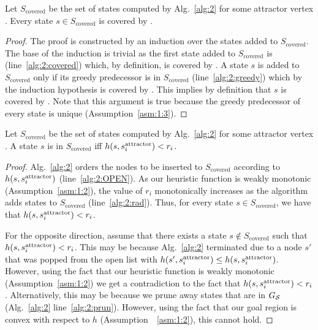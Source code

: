 \documentclass[a4paper]{report}
\begin{document}
\vspace{2mm}
\begin{lemma}
\label{lemma:covered-1}
Let $S_{\text{covered}}$ be the set of states computed by Alg.~\ref{alg:2} for some attractor vertex \sAttract.
%
Every state $s \in S_{\text{covered}}$ is covered by \sAttract.
\end{lemma}
%
\begin{proof}
The proof is constructed by an induction over the states added to $S_{\text{covered}}$.
The base of the induction is trivial as the first state added to $S_{\text{covered}}$  is \sAttract (line~\ref{alg:2:covered}) which, by definition, is covered by \sAttract.
%
A state $s$ is added to $S_{\text{covered}}$ only if its greedy predecessor is in $S_{\text{covered}}$ (line~\ref{alg:2:greedy}) which by the induction hypothesis is covered by \sAttract.
This implies by definition that $s$ is covered by \sAttract.
%
Note that this argument is true because the greedy predecessor of every state is unique (Assumption~\ref{asm:1:3}).
\end{proof}

\begin{lemma}
\label{lemma:covered-2}
Let $S_{\text{covered}}$ be the set of states computed by Alg.~\ref{alg:2} for some attractor vertex \sAttract.
%
A state $s$ is in $S_{\text{covered}}$ iff $h(s, s^{\text{attractor}}_i) < r_i$.
\end{lemma}

\begin{proof}
Alg.~\ref{alg:2} orders the nodes to be inserted to $S_{\text{covered}}$ according to $h(s, s^{\text{attractor}}_i)$ (line~\ref{alg:2:OPEN}).
As our heuristic function is weakly monotonic (Assumption~\ref{asm:1:2}), the value of $r_i$ monotonically increases as the algorithm adds states to $S_{\text{covered}}$ (line~\ref{alg:2:rad}).
Thus, for every state $s \in S_{\text{covered}}$, we have that $h(s, s^{\text{attractor}}_i) < r_i$.

For the opposite direction, assume that there exists a state $s \notin S_{\text{covered}}$ such that $h(s, s^{\text{attractor}}_i) < r_i$.
This may be because  Alg.~\ref{alg:2} terminated due to a node $s'$ that was popped from the open list with 
$h(s', s^{\text{attractor}}_i) \leq h(s, s^{\text{attractor}}_i)$.
However, using the fact that our heuristic function is weakly monotonic (Assumption~\ref{asm:1:2}) we get a contradiction to the fact that $h(s, s^{\text{attractor}}_i) < r_i$.
Alternatively, this may be because we prune away states that are in $G_\mathcal{S}$  (Alg.~\ref{alg:2} line~\ref{alg:2:prun}).
However, using the fact that our goal region is convex with respect to $h$ (Assumption~~\ref{asm:1:2}), this cannot hold.
\end{proof}
\end{document}
